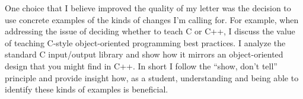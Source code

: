 \documentclass{article}
\begin{document}
One choice that I believe improved the quality of my letter was the decision to use concrete examples of the kinds of changes I'm calling for.  For example, when addressing the issue of deciding whether to teach C or C++, I discuss the value of teaching C-style object-oriented programming best practices.  I analyze the standard C input/output library and show how it mirrors an object-oriented design that you might find in C++.  In short I follow the ``show, don't tell'' principle and provide insight how, as a student, understanding and being able to identify these kinds of examples is beneficial.
\end{document}
